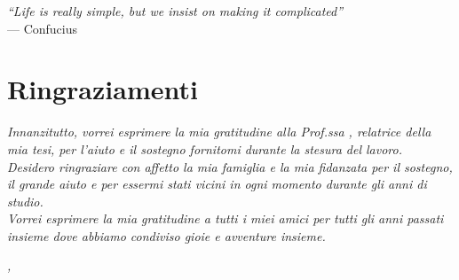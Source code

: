 \cleardoublepage
{}
{}

\begin{flushright}{
    \slshape
    ``Life is really simple, but we insist on making it complicated''} \\
    \medskip
    --- Confucius
\end{flushright}


\bigskip

\begingroup
\let\clearpage\relax
\let\cleardoublepage\relax
\let\cleardoublepage\relax

\chapter*{Ringraziamenti}

\noindent \textit{Innanzitutto, vorrei esprimere la mia gratitudine alla Prof.ssa \myProf, relatrice della mia tesi, per l'aiuto e il sostegno fornitomi durante la stesura del lavoro.}\\

\noindent \textit{Desidero ringraziare con affetto la mia famiglia e la mia fidanzata per il sostegno, il grande aiuto e per essermi stati vicini in ogni momento durante gli anni di studio.}\\

\noindent \textit{Vorrei esprimere la mia gratitudine a tutti i miei amici per tutti gli anni passati insieme dove abbiamo condiviso gioie e avventure insieme.}\\
\bigskip

\noindent\textit{\myLocation, \myTime}
\hfill \myName

\endgroup
